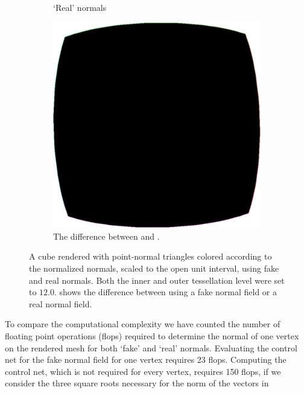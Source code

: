 \begin{figure}
\begin{subfigure}[t]{0.32\linewidth}
		\caption{`Real' normals}
		\label{fig:results:normals:original:real}
	\end{subfigure}	
	\begin{subfigure}[t]{0.32\linewidth}
		\centering
		\includegraphics[width=\textwidth]{content/img/results/normals/cubeNormalsDifference.png}
		\caption{The difference between  and .}
		\label{fig:results:normals:original:difference}
	\end{subfigure}		
	\caption{A cube rendered with point-normal triangles colored according to the normalized normals, scaled to the open unit interval, using  fake and  real normals. Both the inner and outer tessellation level were set to $12.0$.  shows the difference between  using  a fake normal field or  a real normal field.}
	\label{fig:results:normals:original}
\end{figure}

To compare the computational complexity we have counted the number of floating point operations (flops) required to determine the normal of one vertex on the rendered mesh for both `fake' and `real' normals. 
Evaluating the control net for the fake normal field for one vertex requires 23 flops. Computing the control net, which is not required for every vertex, requires 150 flops, if we consider the three square roots necessary for the norm of the vectors in 


